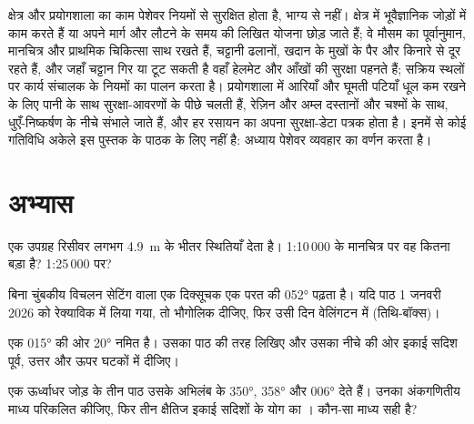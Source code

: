 \begin{safety}
क्षेत्र और प्रयोगशाला का काम पेशेवर नियमों से सुरक्षित होता है, भाग्य से नहीं। क्षेत्र में भूवैज्ञानिक जोड़ों में
काम करते हैं या अपने मार्ग और लौटने के समय की लिखित योजना छोड़ जाते हैं; वे मौसम का पूर्वानुमान, मानचित्र और
प्राथमिक चिकित्सा साथ रखते हैं, चट्टानी ढलानों, खदान के मुखों के पैर और किनारे से दूर रहते हैं, और जहाँ चट्टान गिर
या टूट सकती है वहाँ हेलमेट और आँखों की सुरक्षा पहनते हैं; सक्रिय स्थलों पर कार्य संचालक के नियमों का पालन करता है।
प्रयोगशाला में आरियाँ और घूमती पटियाँ धूल कम रखने के लिए पानी के साथ सुरक्षा-आवरणों के पीछे चलती हैं, रेज़िन और
अम्ल दस्तानों और चश्मों के साथ, धुएँ-निष्कर्षण के नीचे संभाले जाते हैं, और हर रसायन का अपना सुरक्षा-डेटा पत्रक होता है।
इनमें से कोई गतिविधि अकेले इस पुस्तक के पाठक के लिए नहीं है: अध्याय पेशेवर व्यवहार का वर्णन करता है।
\end{safety}

\section{अभ्यास}

\begin{exercise}[$\star$]\label{exo:b1:field-lab-methods-1:1}
एक उपग्रह रिसीवर लगभग \qty{4.9}{m} के भीतर स्थितियाँ देता है। 1:10\,000 के मानचित्र पर वह कितना बड़ा है? 1:25\,000 पर?
\end{exercise}

\begin{exercise}[$\star$]\label{exo:b1:field-lab-methods-1:2}
बिना चुंबकीय विचलन सेटिंग वाला एक दिक्सूचक एक परत की  \ang{052} पढ़ता है। यदि पाठ 1 जनवरी 2026 को
रेक्याविक में लिया गया, तो भौगोलिक  दीजिए, फिर उसी दिन वेलिंगटन में (तिथि-बॉक्स)।
\end{exercise}

\begin{exercise}[$\star$]\label{exo:b1:field-lab-methods-1:3}
एक  \ang{015} की ओर \ang{20} नमित है। उसका  पाठ की तरह लिखिए और उसका नीचे की ओर इकाई सदिश
पूर्व, उत्तर और ऊपर घटकों में दीजिए।
\end{exercise}

\begin{exercise}[$\star$]\label{exo:b1:field-lab-methods-1:4}
एक ऊर्ध्वाधर जोड़ के तीन पाठ उसके अभिलंब के  \ang{350}, \ang{358} और \ang{006} देते हैं। उनका अंकगणितीय माध्य
परिकलित कीजिए, फिर तीन क्षैतिज इकाई सदिशों के योग का । कौन-सा माध्य सही है?
\end{exercise}

